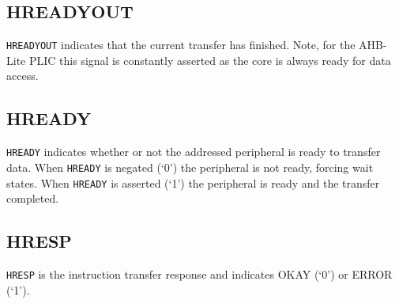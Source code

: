 \subsection{HREADYOUT}

\texttt{HREADYOUT} indicates that the current transfer has finished.
Note, for the AHB-Lite PLIC this signal is constantly asserted as the
core is always ready for data access.

\subsection{HREADY}

\texttt{HREADY} indicates whether or not the addressed peripheral is
ready to transfer data. When \texttt{HREADY} is negated (`0') the
peripheral is not ready, forcing wait states. When \texttt{HREADY} is
asserted (`1') the peripheral is ready and the transfer completed.

\subsection{HRESP}

\texttt{HRESP} is the instruction transfer response and indicates OKAY
(`0') or ERROR (`1').